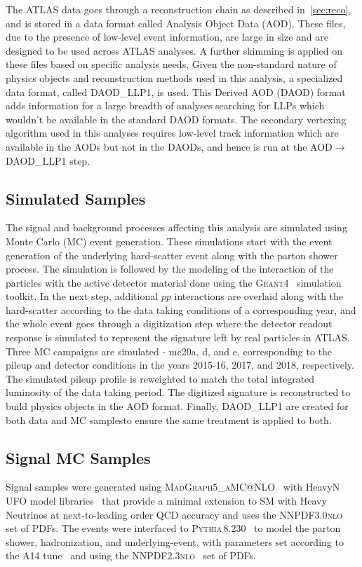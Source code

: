 The ATLAS data goes through a reconstruction chain as described in~\cref{sec:reco}, and is stored in a data format called Analysis Object Data (AOD). These files, due to the presence of low-level event information, are large in size and are designed to be used across ATLAS analyses. A further skimming is applied on these files based on specific analysis needs.
Given the non-standard nature of physics objects and reconstruction methods used in this analysis, a specialized data format, called DAOD\_LLP1, is used. This Derived AOD (DAOD) format adds information for a large breadth of analyses searching for LLPs which wouldn't be available in the standard DAOD formats. The secondary vertexing algorithm used in this analyses requires low-level track information which are available in the AODs but not in the DAODs, and hence is run at the AOD$\rightarrow$DAOD\_LLP1 step. 

\subsection{Simulated Samples}
The signal and background processes affecting this analysis are simulated using Monte Carlo (MC) event generation. These simulations start with the event generation of the underlying hard-scatter event along with the parton shower process. The simulation is followed by the modeling of the interaction of the particles with the active detector material done using the \textsc{Geant4}~\cite{AGOSTINELLI2003250} simulation toolkit. In the next step, additional $pp$ interactions are overlaid along with the hard-scatter according to the data taking conditions of a corresponding year, and the whole event goes through a digitization step where the detector readout response is simulated to represent the signature left by real particles in ATLAS. Three MC campaigns are simulated - mc20a, d, and e, corresponding to the pileup and detector conditions in the years 2015-16, 2017, and 2018, respectively. The simulated pileup profile is reweighted to match the total integrated luminosity of the data taking period. The digitized signature is reconstructed to build physics objects in the AOD format. Finally, DAOD\_LLP1 are created for both data and MC samplesto ensure the same treatment is applied to both.

\subsection*{Signal MC Samples}
Signal samples were generated using \textsc{MadGraph5\_aMC@NLO}~\cite{Alwall:2014hca} with HeavyN UFO model libraries~\cite{PhysRevD.94.053002} that provide a minimal extension to SM with Heavy Neutrinos at next-to-leading order QCD accuracy and uses the \textsc{NNPDF3.0nlo}~\cite{Ball:2014uwa} set of PDFs. The events were interfaced to \textsc{Pythia\,8.230}~\cite{Sjostrand:2014zea} to model the parton shower, hadronization, and underlying-event, with parameters set according to the A14 tune~\cite{ATL-PHYS-PUB-2014-021} and using the \textsc{NNPDF2.3nlo}~\cite{Ball:2012cx} set of PDFs.

